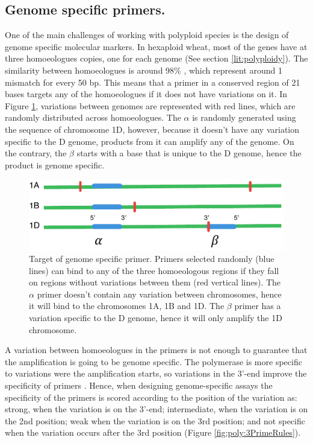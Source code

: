 \subsection{Genome specific primers.}
One of the main challenges of working with polyploid species is the design of genome specific molecular markers. 
In hexaploid wheat, most of the genes have at three homoeologues copies, one for each genome (See section \ref{lit:polyploidy}). 
The similarity between homoeologues is around 98\% \citep{Krasileva2013}, which represent around 1 mismatch for every 50 bp. 
This means that a primer in a conserved region of 21 bases targets any of the homoeologues if it does not have variations on it.
In Figure \ref{fig:poly:pimerChrSpecificDiagram}, variations between genomes are represented with red lines, which are randomly distributed across homoeologues. 
The $\alpha$ is randomly generated using the sequence of chromosome 1D, however, because it doesn't have any variation specific to the D genome, products from it can amplify any of the genome. 
On the contrary, the $\beta$ starts with a base that is unique to the D genome, hence the product is genome specific. 

\begin{figure}
\includegraphics[width=1\textwidth]{PolyMarker/Figures/intro/primerChrSpecificDiagram.pdf}
\caption[Target of genome specific primer.]{Target of genome specific primer. Primers selected randomly (blue lines) can bind to any of the three homoeologous regions if they fall on regions without variations between them (red vertical lines). The $\alpha$ primer doesn't contain any variation between chromosomes, hence it will bind to the chromosomes 1A, 1B and 1D. The $\beta$ primer has a variation specific to the D genome, hence it will only amplify the 1D chromosome.}
\label{fig:poly:pimerChrSpecificDiagram}
\end{figure}

A variation between homoeologues in the primers is not enough to guarantee that the amplification is going to be genome specific. 
The polymerase is more specific to variations were the amplification starts, so variations in the 3'-end improve the specificity of primers \citep{Huang2010}. 
Hence, when designing genome-specific assays the specificity of the primers is scored according to the position of the variation as:  strong, when the variation is on the 3'-end; intermediate, when the variation is on the 2nd position; weak when the variation is on the 3rd position; and not specific when the variation occurs after the 3rd position (Figure \ref{fig:poly:3PrimeRules}).  

